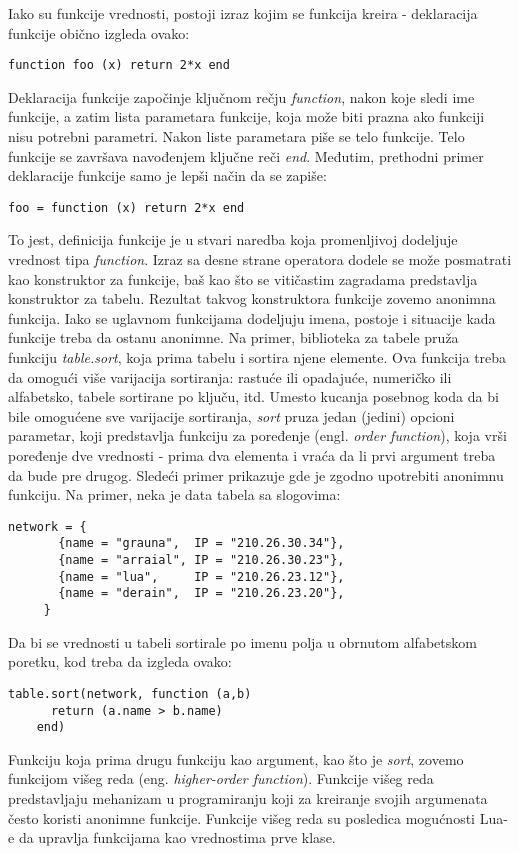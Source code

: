 \documentclass[a4paper]{article}
\begin{document}
Iako su funkcije vrednosti, postoji izraz kojim se funkcija kreira - deklaracija funkcije obično izgleda ovako:
\begin{lstlisting}[caption={Deklaracija funkcije \cite{bookProgInLua}},frame=single, label=fun1]
    function foo (x) return 2*x end
\end{lstlisting}
Deklaracija funkcije započinje ključnom rečju \textit{function}, nakon koje sledi ime funkcije, a zatim lista parametara funkcije, koja može biti prazna ako funkciji nisu potrebni parametri. Nakon liste parametara piše se telo funkcije. Telo funkcije se završava navođenjem ključne reči \textit{end}.
Međutim, prethodni primer deklaracije funkcije samo je lepši način da se zapiše:
\begin{lstlisting}[caption={Dodela vrednosti tipa \textit{function} promenljivoj foo \cite{bookProgInLua}},frame=single, label=fun1]
    foo = function (x) return 2*x end
\end{lstlisting}
To jest, definicija funkcije je u stvari naredba koja promenljivoj dodeljuje vrednost tipa \textit{function}. Izraz sa desne strane operatora dodele se može posmatrati kao konstruktor za funkcije, baš kao što se vitičastim zagradama predstavlja konstruktor za tabelu. Rezultat takvog konstruktora funkcije zovemo anonimna funkcija. Iako se uglavnom funkcijama dodeljuju imena, postoje i situacije kada funkcije treba da ostanu anonimne. Na primer, biblioteka za tabele pruža funkciju \textit{table.sort}, koja prima tabelu i sortira njene elemente. Ova funkcija treba da omogući više varijacija sortiranja: rastuće ili opadajuće, numeričko ili alfabetsko, tabele sortirane po ključu, itd. Umesto kucanja posebnog koda da bi bile omogućene sve varijacije sortiranja, \textit{sort} pruza jedan (jedini) opcioni parametar, koji predstavlja funkciju za poređenje (engl. \textit{order function}), koja vrši poređenje dve vrednosti - prima dva elementa i vraća da li prvi argument treba da bude pre drugog. Sledeći primer prikazuje gde je zgodno upotrebiti anonimnu funkciju. Na primer, neka je data tabela sa slogovima:
\begin{lstlisting}[caption={Primer tabele \cite{bookProgInLua}},frame=single, label=fun2]
     network = {
       {name = "grauna",  IP = "210.26.30.34"},
       {name = "arraial", IP = "210.26.30.23"},
       {name = "lua",     IP = "210.26.23.12"},
       {name = "derain",  IP = "210.26.23.20"},
     }
\end{lstlisting}
Da bi se vrednosti u tabeli sortirale po imenu polja u obrnutom alfabetskom poretku, kod treba da izgleda ovako:
\begin{lstlisting}[caption={Sortiranje vrednosti tabele \cite{bookProgInLua}},frame=single, label=fun3]
    table.sort(network, function (a,b)
      return (a.name > b.name)
    end)
\end{lstlisting}
Funkciju koja prima drugu funkciju kao argument, kao što je \textit{sort}, zovemo funkcijom višeg reda (eng. \textit{higher-order function}). Funkcije višeg reda predstavljaju mehanizam u programiranju koji za kreiranje svojih argumenata često koristi anonimne funkcije. Funkcije višeg reda su posledica mogućnosti Lua-e da upravlja funkcijama kao vrednostima prve klase.
\end{document}
